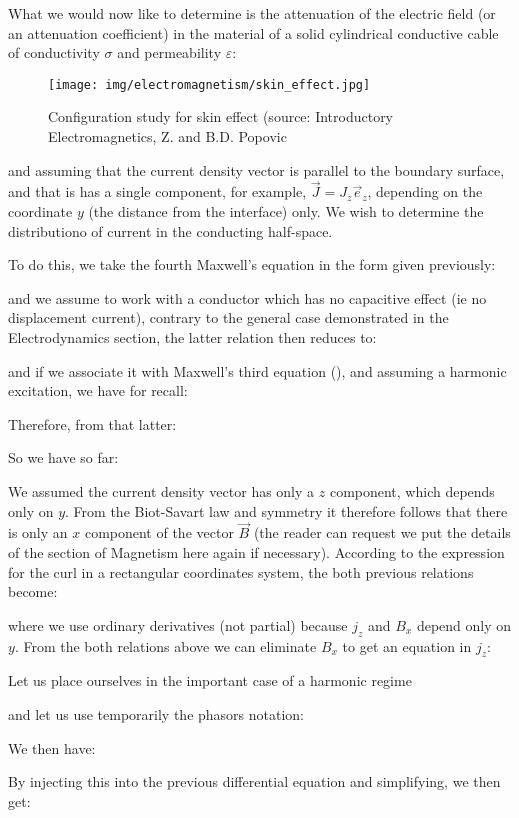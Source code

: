 	What we would now like to determine is the attenuation of the electric field (or an attenuation coefficient) in the material of a solid cylindrical conductive cable of conductivity $\sigma$ and permeability $\varepsilon$:
	\begin{figure}[H]
		\centering
		\texttt{[image: img/electromagnetism/skin\_effect.jpg]}
		\caption[Configuration study for skin effect]{Configuration study for skin effect (source: Introductory Electromagnetics, Z. and B.D. Popovic}
	\end{figure}
	and assuming that the current density vector is parallel to the boundary surface, and that is has a single component, for example, $\vec{J}=J_z\vec{e}_z$, depending on the coordinate $y$ (the distance from the interface) only. We wish to determine the distributiono of current in the conducting half-space.
	
	To do this, we take the fourth Maxwell's equation in the form given previously:
	
	and we assume to work with a conductor which has no capacitive effect (ie no displacement current), contrary to the general case demonstrated in the Electrodynamics section, the latter relation then reduces to:
	
	and if we associate it with Maxwell's third equation (), and assuming a harmonic excitation, we have for recall:
	
	Therefore, from that latter:
	
	So we have so far:	
	
	We assumed the current density vector has only a $z$ component, which depends only on $y$. From the Biot-Savart law and symmetry it therefore follows that there is only an $x$ component of the vector $\vec{B}$ (the reader can request we put the details of the section of Magnetism here again if necessary). According to the expression for the curl in a rectangular coordinates system, the both previous relations become:
	
	where we use ordinary derivatives (not partial) because $j_z$ and $B_x$ depend only on $y$.
	From the both relations above we can eliminate $B_x$ to get an equation in $j_z$:
	
	Let us place ourselves in the important case of a harmonic regime
	
	and let us use temporarily the phasors notation:
	
	We then have:
	
	By injecting this into the previous differential equation and simplifying, we then get:
	

